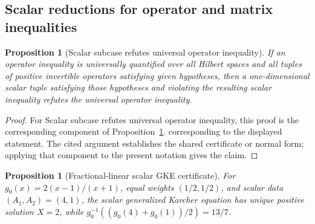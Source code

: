 \documentclass[11pt]{article}
\numberwithin{equation}{section}
\newtheorem{proposition}[theorem]{Proposition}
\theoremstyle{definition}
\theoremstyle{remark}
\newcommand{\1}{\mathbf 1}
\begin{document}
\subsection{Scalar reductions for operator and matrix inequalities}
\begin{proposition}[Scalar subcase refutes universal operator inequality]
\label{res:scalar-subcase-refutes-universal-operator-inequality}
If an operator inequality is universally quantified over all Hilbert spaces and all tuples of positive invertible operators satisfying given hypotheses, then a one-dimensional scalar tuple satisfying those hypotheses and violating the resulting scalar inequality refutes the universal operator inequality.
\end{proposition}

\begin{proof}
For Scalar subcase refutes universal operator inequality, this proof is the corresponding component of Proposition~\ref{res:yamazaki-fractional-linear-gke-scalar-certificate}.  corresponding to the displayed statement.  The cited argument establishes the shared certificate or normal form; applying that component to the present notation gives the claim.
\end{proof}

\begin{proposition}[Fractional-linear scalar GKE certificate]
\label{res:yamazaki-fractional-linear-gke-scalar-certificate}
For \(g_0(x)=2(x-1)/(x+1)\), equal weights \((1/2,1/2)\), and scalar data \((A_1,A_2)=(4,1)\), the scalar generalized Karcher equation has unique positive solution \(X=2\), while \(g_0^{-1}((g_0(4)+g_0(1))/2)=13/7\).
\end{proposition}
\end{document}
